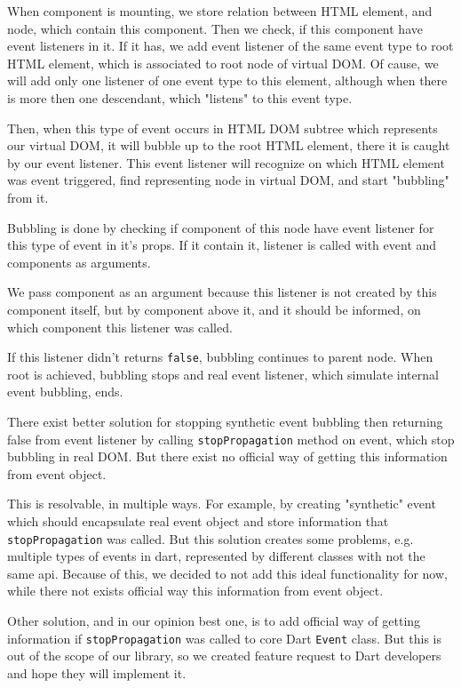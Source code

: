 \documentclass[oneside, 12pt]{book}
\begin{document}
      When component is mounting, we store relation between HTML element, and node, which contain this component. 
      Then we check, if this component have event listeners in it. 
      If it has, we add event listener of the same event type to root HTML element, 
      which is associated to root node of virtual DOM. 
      Of cause, we will add only one listener of one event type to this element, 
      although when there is more then one descendant, which "listens" to this event type.

      Then, when this type of event occurs in HTML DOM subtree which represents our virtual DOM, 
      it will bubble up to the root HTML element, there it is caught by our event listener. 
      This event listener will recognize on which HTML element was event triggered, 
      find representing node in virtual DOM, and start "bubbling" from it.

      Bubbling is done by checking if component of this node have event listener for this type of event in it's props.
      If it contain it, listener is called with event and components as arguments. 

      We pass component as an argument because this listener is not created by this component itself, 
      but by component above it, and it should be informed, on which component this listener was called.

      If this listener didn't returns \texttt{false}, bubbling continues to parent node. 
      When root is achieved, bubbling stops and real event listener, 
      which simulate internal event bubbling, ends.

      There exist better solution for stopping synthetic event bubbling then returning false from event listener 
      by calling \texttt{stopPropagation} method on event, which stop bubbling in real DOM. 
      But there exist no official way of getting this information from event object. 

      This is resolvable, in multiple ways. For example, by creating "synthetic" event
      which should encapsulate real event object and store information that \texttt{stopPropagation} was called.
      But this solution creates some problems, e.g. multiple types of events in dart, 
      represented by different classes with not the same api.
      Because of this, we decided to not add this ideal functionality for now, while there not exists official way this information from event object.

      Other solution, and in our opinion best one, 
      is to add official way of getting information if \texttt{stopPropagation} was called to core Dart \texttt{Event} class.
      But this is out of the scope of our library, so we created feature request to Dart developers and hope they will implement it.
\end{document}
